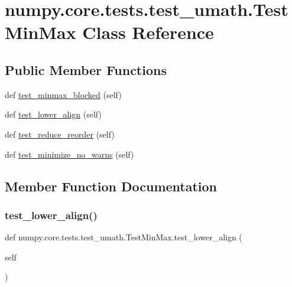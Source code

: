 \hypertarget{classnumpy_1_1core_1_1tests_1_1test__umath_1_1TestMinMax}{}\section{numpy.\+core.\+tests.\+test\+\_\+umath.\+Test\+Min\+Max Class Reference}
\label{classnumpy_1_1core_1_1tests_1_1test__umath_1_1TestMinMax}
\subsection*{Public Member Functions}
\begin{DoxyCompactItemize}
\item 
def \hyperlink{classnumpy_1_1core_1_1tests_1_1test__umath_1_1TestMinMax_a8d1300664c9659e3f73048a0006b9e3b}{test\+\_\+minmax\+\_\+blocked} (self)
\item 
def \hyperlink{classnumpy_1_1core_1_1tests_1_1test__umath_1_1TestMinMax_a6e05ba1b90c054271fd28430c8b7f522}{test\+\_\+lower\+\_\+align} (self)
\item 
def \hyperlink{classnumpy_1_1core_1_1tests_1_1test__umath_1_1TestMinMax_a590ce98d84d488c117dab1edbf99c647}{test\+\_\+reduce\+\_\+reorder} (self)
\item 
def \hyperlink{classnumpy_1_1core_1_1tests_1_1test__umath_1_1TestMinMax_a16519fe8be69534c73196e07d7ed0a71}{test\+\_\+minimize\+\_\+no\+\_\+warns} (self)
\end{DoxyCompactItemize}


\subsection{Member Function Documentation}
\mbox{\label{classnumpy_1_1core_1_1tests_1_1test__umath_1_1TestMinMax_a6e05ba1b90c054271fd28430c8b7f522}} 
\subsubsection{\texorpdfstring{test\+\_\+lower\+\_\+align()}{test\_lower\_align()}}
{\footnotesize\ttfamily def numpy.\+core.\+tests.\+test\+\_\+umath.\+Test\+Min\+Max.\+test\+\_\+lower\+\_\+align (\begin{DoxyParamCaption}\item[{}]{self }\end{DoxyParamCaption})}

